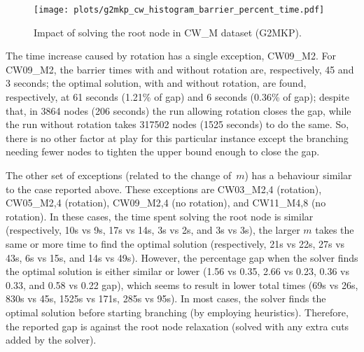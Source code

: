 \begin{figure}[!htbp]
  \caption{Impact of solving the root node in CW\_M dataset (G2MKP).}
  \center
  \texttt{[image: plots/g2mkp\_cw\_histogram\_barrier\_percent\_time.pdf]}
  \label{fig:g2mkp_cw_histogram_barrier_percent_time}
\end{figure}

The time increase caused by rotation has a single exception, CW09\_M2.
For CW09\_M2, the barrier times with and without rotation are, respectively, 45 and 3 seconds; the optimal solution, with and without rotation, are found, respectively, at 61 seconds (1.21\% of gap) and 6 seconds (0.36\% of gap); despite that, in 3864 nodes (206 seconds) the run allowing rotation closes the gap, while the run without rotation takes 317502 nodes (1525 seconds) to do the same.
So, there is no other factor at play for this particular instance except the branching needing fewer nodes to tighten the upper bound enough to close the gap.



The other set of exceptions (related to the change of~\(m\)) has a behaviour similar to the case reported above.
These exceptions are CW03\_M{2,4} (rotation), CW05\_M{2,4} (rotation), CW09\_M{2,4} (no rotation), and CW11\_M{4,8} (no rotation).
In these cases, the time spent solving the root node is similar (respectively, 10s vs 9s, 17s vs 14s, 3s vs 2s, and 3s vs 3s), the larger \(m\) takes the same or more time to find the optimal solution (respectively, 21s vs 22s, 27s vs 43s, 6s vs 15s, and 14s vs 49s).
However, the percentage gap when the solver finds the optimal solution is either similar or lower (1.56 vs 0.35, 2.66 vs 0.23, 0.36 vs 0.33, and 0.58 vs 0.22 gap), which seems to result in lower total times (69s vs 26s, 830s vs 45s, 1525s vs 171s, 285s vs 95s).
In most cases, the solver finds the optimal solution before starting branching (by employing heuristics).
Therefore, the reported gap is against the root node relaxation (solved with any extra cuts added by the solver).

